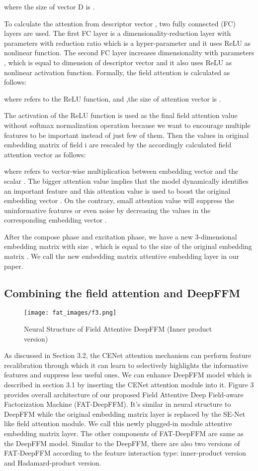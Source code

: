 \documentclass{article}
\begin{document}
 where the size of vector D is .
 
 
 To calculate the attention from descriptor vector , two fully connected (FC) layers are used. The first FC layer is a dimensionality-reduction layer with parameters  with reduction ratio  which is a hyper-parameter and it uses ReLU as nonlinear function. The second FC layer increases dimensionality with parameters  , which is equal to dimension of descriptor vector  and it also uses ReLU as nonlinear activation function. Formally, the field attention is calculated as follows:

where  refers to the ReLU function,  and ,the size of attention vector  is  . 


The activation of the ReLU function is used as the final field attention value without softmax normalization operation because we want to encourage multiple features to be important instead of just few of them. Then the values in original embedding matrix  of field i are rescaled by the accordingly calculated field attention vector  as follows:

where  refers to vector-wise multiplication between embedding vector  and the scalar . The bigger attention value  implies that the model dynamically identifies an important feature and this attention value is used to boost the original embedding vector . On the contrary, small attention value  will suppress the uninformative features or even noise by decreasing the values in the corresponding embedding vector .


After the compose phase and excitation phase, we have a new 3-dimensional embedding matrix  with size , which is equal to the size of the original embedding matrix . We call the new embedding matrix attentive embedding layer in our paper.

\subsection{Combining the field attention and DeepFFM}
\begin{figure}[hbt!]
\texttt{[image: fat\_images/f3.png]}
\caption{Neural Structure of Field Attentive DeepFFM (Inner product version)}
\label{fig:f3}
\end{figure}
As discussed in Section 3.2, the CENet attention mechanism can perform feature recalibration through which it can learn to selectively highlights the informative features and suppress less useful ones. We can enhance DeepFFM model which is described in section 3.1 by inserting the CENet attention module into it. Figure 3 provides overall architecture of our proposed Field Attentive Deep Field-aware Factorization Machine (FAT-DeepFFM). It's similar in neural structure to DeepFFM while the original embedding matrix layer is replaced by the SE-Net like field attention module. We call this newly plugged-in module attentive embedding matrix layer. The other components of FAT-DeepFFM are same as the DeepFFM model. Similar to the DeepFFM, there are also two versions of FAT-DeepFFM according to the feature interaction type: inner-product version and Hadamard-product version.
\end{document}
